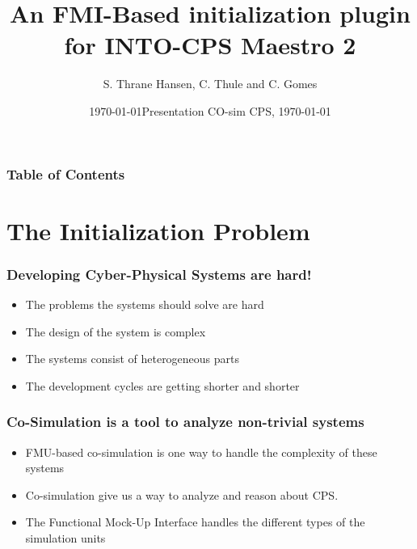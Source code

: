 \documentclass{beamer}
\title[FMI-Based initialization plugin for Maestro 2] %
{An FMI-Based initialization plugin for INTO-CPS Maestro 2}
\date{\today}
\author[Thrane Hansen, Simon] %
{S. Thrane Hansen, C. Thule and C. Gomes}
\institute[AU] %
{
  Department of Engineering\\
  Aarhus University
}
\date[AU 2020] %
{Presentation CO-sim CPS, \today}
\begin{document}
\frame{\titlepage}

\begin{frame}
\frametitle{Table of Contents}
\tableofcontents
\end{frame}

\section{The Initialization Problem}
\begin{frame}
\frametitle{Developing Cyber-Physical Systems are hard!}
\begin{itemize}
    \item The problems the systems should solve are hard
    \item The design of the system is complex
    \item The systems consist of heterogeneous parts
    \item The development cycles are getting shorter and shorter
\end{itemize}

\end{frame}

\begin{frame}
\frametitle{Co-Simulation is a tool to analyze \textbf{non-trivial} systems}
\begin{itemize}
    \item FMU-based co-simulation is one way to handle the complexity of these systems
    \item Co-simulation give us a way to analyze and reason about CPS.
    \item The Functional Mock-Up Interface handles the different types of the simulation units
\end{itemize}

\end{frame}
\end{document}
